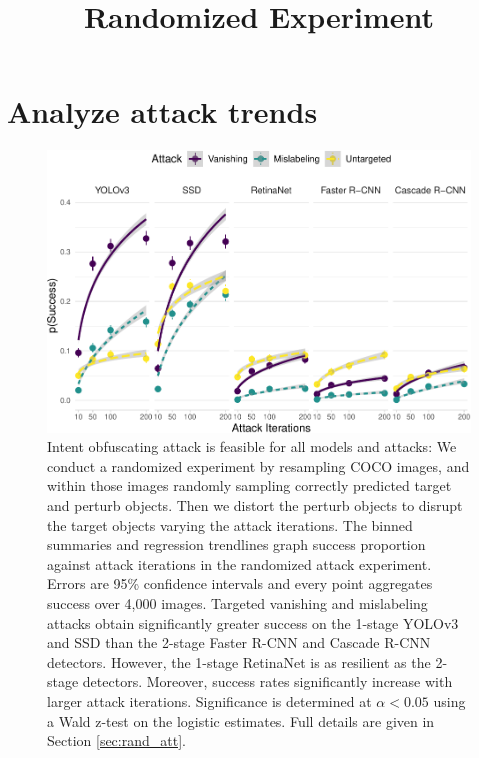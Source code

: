 \documentclass[
]{article}
\title{Randomized Experiment}
\author{}
\date{\vspace{-2.5em}}
\begin{document}
\maketitle

\section{Analyze attack trends}\label{analyze-attack-trends}

\begin{figure}[tb]

{\centering \includegraphics[width=1\linewidth]{imgs/success_trend_graph-1} 

}

\caption{Intent obfuscating attack is feasible for all models and attacks:  We conduct a randomized experiment by resampling COCO images, and within those images randomly sampling correctly predicted target and perturb objects. Then we distort the perturb objects to disrupt the target objects varying the attack iterations. The binned summaries and regression trendlines graph success proportion against attack iterations in the randomized attack experiment. Errors are 95\% confidence intervals and every point aggregates success over 4,000 images. Targeted vanishing and mislabeling attacks obtain significantly greater success on the 1-stage YOLOv3 and SSD than the 2-stage Faster R-CNN and Cascade R-CNN detectors. However, the 1-stage RetinaNet is as resilient as the 2-stage detectors. Moreover, success rates significantly increase with larger attack iterations. Significance is determined at $\alpha < 0.05$ using a Wald z-test on the logistic estimates. Full details are given in Section \ref{sec:rand_att}.}\label{fig:success_trend_graph}
\end{figure}
\end{document}
